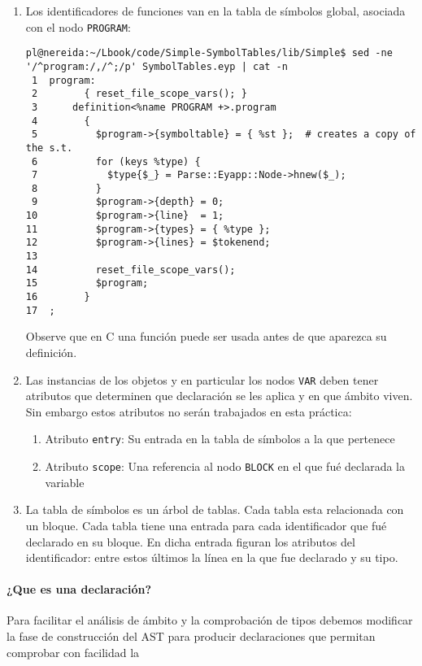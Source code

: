\begin{enumerate}
\item
Los identificadores de funciones van en la tabla de símbolos global, asociada con el nodo
\verb|PROGRAM|:

\begin{verbatim}
pl@nereida:~/Lbook/code/Simple-SymbolTables/lib/Simple$ sed -ne '/^program:/,/^;/p' SymbolTables.eyp | cat -n
 1  program:
 2        { reset_file_scope_vars(); }
 3      definition<%name PROGRAM +>.program
 4        {
 5          $program->{symboltable} = { %st };  # creates a copy of the s.t.
 6          for (keys %type) {
 7            $type{$_} = Parse::Eyapp::Node->hnew($_);
 8          }
 9          $program->{depth} = 0;
10          $program->{line}  = 1;
11          $program->{types} = { %type };
12          $program->{lines} = $tokenend;
13
14          reset_file_scope_vars();
15          $program;
16        }
17  ;
\end{verbatim}

Observe que en C una función puede ser usada antes de que aparezca su definición.

\item
  Las instancias de los objetos y en particular los nodos \verb|VAR| deben tener atributos
  que determinen que declaración se les aplica y en que ámbito viven. Sin embargo estos
  atributos no serán trabajados en esta práctica:
  \begin{enumerate}
  \item
  Atributo \verb|entry|: Su entrada en la tabla de símbolos a la que pertenece
  \item
  Atributo \verb|scope|: Una referencia al nodo \verb|BLOCK| en el que fué declarada la variable
  \end{enumerate}

\item
La tabla de símbolos es un árbol de tablas. Cada tabla esta relacionada con un bloque.
Cada tabla tiene una entrada para cada identificador que fué declarado
en su bloque.  En dicha entrada figuran los atributos del identificador: entre estos 
últimos la línea en la que fue declarado y su tipo.

\end{enumerate}

\paragraph{¿Que es una declaración?}

Para facilitar el análisis de ámbito y la comprobación de tipos
debemos modificar la fase de construcción del AST para
producir declaraciones que permitan comprobar con facilidad
la 

